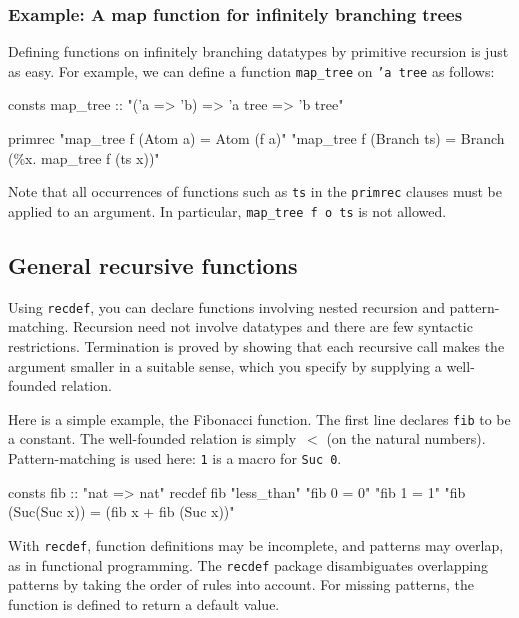 \subsubsection{Example: A map function for infinitely branching trees}
Defining functions on infinitely branching datatypes by primitive
recursion is just as easy. For example, we can define a function
\texttt{map_tree} on \texttt{'a tree} as follows:
\begin{ttbox}
consts
  map_tree :: "('a => 'b) => 'a tree => 'b tree"

primrec
  "map_tree f (Atom a) = Atom (f a)"
  "map_tree f (Branch ts) = Branch (\%x. map_tree f (ts x))"
\end{ttbox}
Note that all occurrences of functions such as \texttt{ts} in the
\texttt{primrec} clauses must be applied to an argument. In particular,
\texttt{map_tree f o ts} is not allowed.



\subsection{General recursive functions}
\label{sec:HOL:recdef}

Using \texttt{recdef}, you can declare functions involving nested recursion
and pattern-matching.  Recursion need not involve datatypes and there are few
syntactic restrictions.  Termination is proved by showing that each recursive
call makes the argument smaller in a suitable sense, which you specify by
supplying a well-founded relation.

Here is a simple example, the Fibonacci function.  The first line declares
\texttt{fib} to be a constant.  The well-founded relation is simply~$<$ (on
the natural numbers).  Pattern-matching is used here: \texttt{1} is a
macro for \texttt{Suc~0}.
\begin{ttbox}
consts fib  :: "nat => nat"
recdef fib "less_than"
    "fib 0 = 0"
    "fib 1 = 1"
    "fib (Suc(Suc x)) = (fib x + fib (Suc x))"
\end{ttbox}

With \texttt{recdef}, function definitions may be incomplete, and patterns may
overlap, as in functional programming.  The \texttt{recdef} package
disambiguates overlapping patterns by taking the order of rules into account.
For missing patterns, the function is defined to return a default value.



